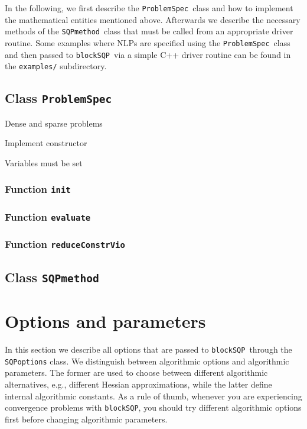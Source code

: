 \documentclass[	11pt,
				a4paper,
				abstract=true,
				twoside=true,
				bibliography=totoc, 
				headinclude=true,
				footinclude=false]{scrartcl}
\newcommand{\blockSQP}{\texttt{blockSQP}}
\newcommand{\method}{\texttt{SQPmethod}}
\newcommand{\problem}{\texttt{ProblemSpec}}
\newcommand{\init}{\texttt{init}}
\newcommand{\evaluate}{\texttt{evaluate}}
\newcommand{\reduce}{\texttt{reduceConstrVio}}
\begin{document}
In the following, we first describe the \problem\ class and how to implement the mathematical entities mentioned above. 
Afterwards we describe the necessary methods of the \method\ class that must be called from an appropriate driver routine. Some examples where NLPs are specified using the \problem\ class and then passed to \blockSQP\ via a simple C++ driver routine can be found in the \texttt{examples/} subdirectory.


\subsection{Class \problem}
Dense and sparse problems

Implement constructor

Variables must be set
\subsubsection{Function \init}


\subsubsection{Function \evaluate}


\subsubsection{Function \reduce}

\subsection{Class \method}

\section{Options and parameters}
In this section we describe all options that are passed to \blockSQP\ through the \texttt{SQPoptions} class.
We distinguish between algorithmic options and algorithmic parameters. The former are used to choose between different algorithmic alternatives, e.g., different Hessian approximations, while the latter define internal algorithmic constants. As a rule of thumb, whenever you are experiencing convergence problems with \blockSQP, you should try different algorithmic options first before changing algorithmic parameters.
\end{document}
